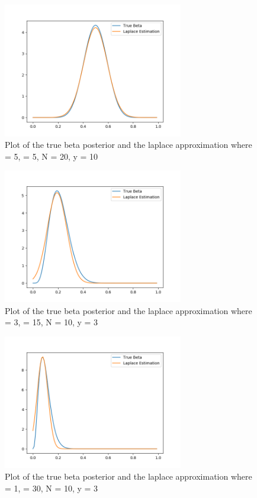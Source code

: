 \documentclass[10pt]{article}
\begin{document}
\begin{itemize}

\begin{figure}
\centering
\includegraphics[width=0.7\textwidth]{part1.png}
\caption{\label{fig:1}Plot of the true beta posterior and the laplace approximation where \alpha = 5, \beta = 5, N = 20, y = 10}
\end{figure}

\begin{figure}
\centering
\includegraphics[width=0.7\textwidth]{part2.png}
\caption{\label{fig:2}Plot of the true beta posterior and the laplace approximation where \alpha = 3, \beta = 15, N = 10, y = 3}
\end{figure}

\begin{figure}
\centering
\includegraphics[width=0.7\textwidth]{part3.png}
\caption{\label{fig:3}Plot of the true beta posterior and the laplace approximation where \alpha = 1, \beta = 30, N = 10, y = 3}
\end{figure}


\end{itemize}
\end{document}
